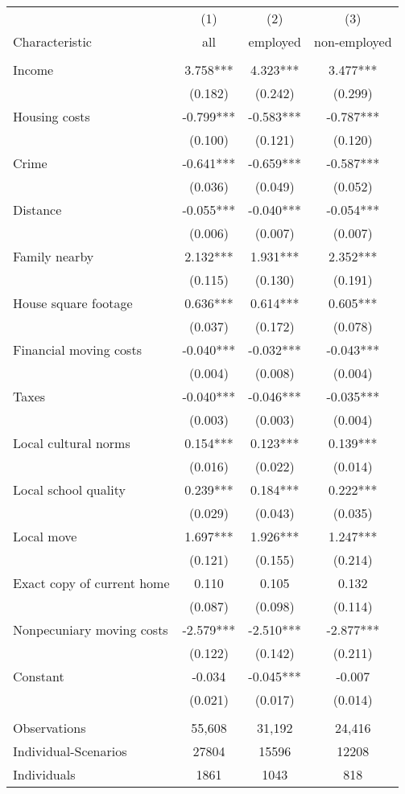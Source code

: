 \begin{tabular}{lccc} \hline
 & (1) & (2) & (3) \\
Characteristic & all & employed & non-employed \\ \hline
 &  &  &  \\
Income & 3.758*** & 4.323*** & 3.477*** \\
 & (0.182) & (0.242) & (0.299) \\
Housing costs & -0.799*** & -0.583*** & -0.787*** \\
 & (0.100) & (0.121) & (0.120) \\
Crime & -0.641*** & -0.659*** & -0.587*** \\
 & (0.036) & (0.049) & (0.052) \\
Distance & -0.055*** & -0.040*** & -0.054*** \\
 & (0.006) & (0.007) & (0.007) \\
Family nearby & 2.132*** & 1.931*** & 2.352*** \\
 & (0.115) & (0.130) & (0.191) \\
House square footage & 0.636*** & 0.614*** & 0.605*** \\
 & (0.037) & (0.172) & (0.078) \\
Financial moving costs & -0.040*** & -0.032*** & -0.043*** \\
 & (0.004) & (0.008) & (0.004) \\
Taxes & -0.040*** & -0.046*** & -0.035*** \\
 & (0.003) & (0.003) & (0.004) \\
Local cultural norms & 0.154*** & 0.123*** & 0.139*** \\
 & (0.016) & (0.022) & (0.014) \\
Local school quality & 0.239*** & 0.184*** & 0.222*** \\
 & (0.029) & (0.043) & (0.035) \\
Local move & 1.697*** & 1.926*** & 1.247*** \\
 & (0.121) & (0.155) & (0.214) \\
Exact copy of current home & 0.110 & 0.105 & 0.132 \\
 & (0.087) & (0.098) & (0.114) \\
Nonpecuniary moving costs & -2.579*** & -2.510*** & -2.877*** \\
 & (0.122) & (0.142) & (0.211) \\
Constant & -0.034 & -0.045*** & -0.007 \\
 & (0.021) & (0.017) & (0.014) \\
 &  &  &  \\
Observations & 55,608 & 31,192 & 24,416 \\
Individual-Scenarios & 27804 & 15596 & 12208 \\
 Individuals & 1861 & 1043 & 818 \\ \hline
\end{tabular}
